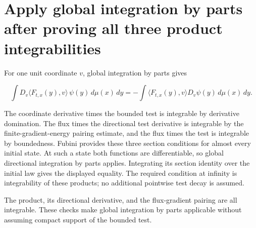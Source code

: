 \documentclass[11pt,a4paper]{article}
\begin{document}
\section{\texorpdfstring{Apply global integration by parts after proving all three product integrabilities}{Apply global integration by parts after proving all three product integrabilities}}


For one unit coordinate \(v\), global integration by parts gives

\[\int D_v\langle F_{t,x}(y),v\rangle\,\psi(y)\,d\mu(x)\,dy=-\int\langle F_{t,x}(y),v\rangle D_v\psi(y)\,d\mu(x)\,dy.\]

The coordinate derivative times the bounded test is integrable by derivative domination. The flux times the directional test derivative is integrable by the finite-gradient-energy pairing estimate, and the flux times the test is integrable by boundedness. Fubini provides these three section conditions for almost every initial state. At such a state both functions are differentiable, so global directional integration by parts applies. Integrating its section identity over the initial law gives the displayed equality. The required condition at infinity is integrability of these products; no additional pointwise test decay is assumed.



The product, its directional derivative, and the flux-gradient pairing are all integrable. These checks make global integration by parts applicable without assuming compact support of the bounded test.
\end{document}
